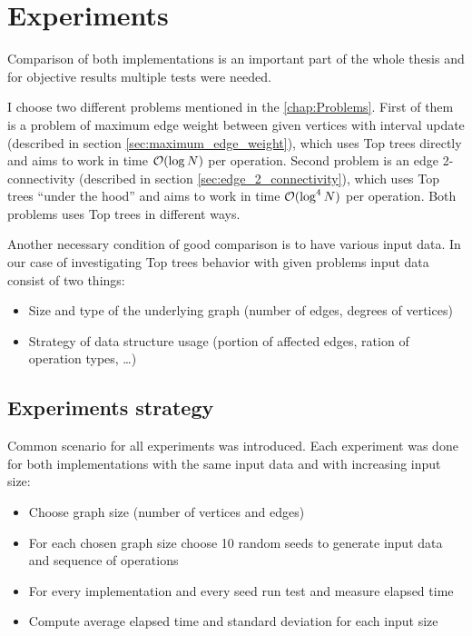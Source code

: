 \chapter{Experiments}
\label{chap:Experiments}

Comparison of both implementations is an important part of the whole thesis
and for objective results multiple tests were needed.

I choose two different problems mentioned in the \cref{chap:Problems}.
First of them is a problem of maximum edge weight between given vertices with
interval update (described in section \ref{sec:maximum_edge_weight}), which uses
Top trees directly and aims to work in time ${\cal O}(\log N)$ per operation. Second
problem is an edge 2-connectivity (described in section \ref{sec:edge_2_connectivity}),
which uses Top trees ``under the hood'' and aims to work in time ${\cal O}(\log^4 N)$
per operation. Both problems uses Top trees in different ways.

Another necessary condition of good comparison is to have various input data. In
our case of investigating Top trees behavior with given problems input data
consist of two things:
\begin{itemize}
\item Size and type of the underlying graph (number of edges, degrees of vertices)
\item Strategy of data structure usage (portion of affected edges, ration of
operation types, \dots)
\end{itemize}

\section{Experiments strategy}

Common scenario for all experiments was introduced. Each experiment was done
for both implementations with the same input data and with increasing input
size:

\begin{itemize}
\item Choose graph size (number of vertices and edges)
\item For each chosen graph size choose 10 random seeds to generate input data
and sequence of operations
\item For every implementation and every seed run test and measure elapsed time
\item Compute average elapsed time and standard deviation for each input size
\end{itemize}

